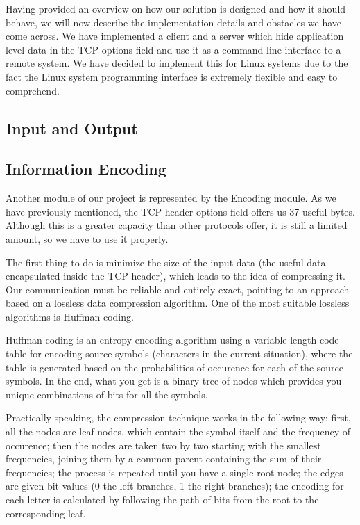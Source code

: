 Having provided an overview on how our solution is designed and how it should
behave, we will now describe the implementation details and obstacles we have
come across. We have implemented a client and a server which hide application
level data in the TCP options field and use it as a command-line interface to
a remote system. We have decided to implement this for Linux systems due to
the fact the Linux system programming interface is extremely flexible and easy
to comprehend.

\subsection{Input and Output}

\subsection{Information Encoding}

Another module of our project is represented by the Encoding module. As we
have previously mentioned, the TCP header options field offers us 37 useful
bytes. Although this is a greater capacity than other protocols offer, it is
still a limited amount, so we have to use it properly.

The first thing to do is minimize the size of the input data (the useful
data encapsulated inside the TCP header), which leads to the idea of compressing
it. Our communication must be reliable and entirely exact, pointing to an
approach based on a lossless data compression algorithm. One of the most
suitable lossless algorithms is Huffman coding.

Huffman coding\cite{huffman1952method} is an entropy encoding algorithm using
a variable-length code table for encoding source symbols (characters in the
current situation), where the table is generated based on the probabilities of
occurence for each of the source symbols. In the end, what you get is a binary
tree of nodes which provides you unique combinations of bits for all the
symbols.

Practically speaking, the compression technique works in the following way:
first, all the nodes are leaf nodes, which contain the symbol itself and the
frequency of occurence; then the nodes are taken two by two starting with the
smallest frequencies, joining them by a common parent containing the sum of
their frequencies; the process is repeated until you have a single root node;
the edges are given bit values (0 the left branches, 1 the right branches);
the encoding for each letter is calculated by following the path of bits from
the root to the corresponding leaf.

